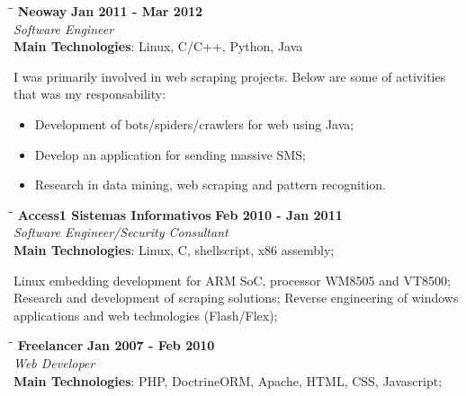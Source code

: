 \documentclass[margin]{res}
\begin{document}
\begin{resume}
   \begin{tabbing}
   \hspace{2.3in}\= \hspace{1.7in}\= \kill %
    \textbf{Neoway}    \>\>\textbf{Jan 2011 - Mar 2012}\\
    \textit{Software Engineer}\\   
    \textbf{Main Technologies}: Linux, C/C++, Python, Java
   \end{tabbing}\vspace{-20pt}      %
    \vspace{2mm}
    I was primarily involved in web scraping projects. Below are some of activities that was my responsability:
    
    \begin{itemize}
  \item Development of bots/spiders/crawlers for web using Java;
  \item Develop an application for sending massive SMS;
  \item Research in data mining, web scraping and pattern recognition.
\end{itemize}

   
   \vspace{2mm}
   \begin{tabbing}
   \hspace{2.3in}\= \hspace{1.5in}\= \kill %
    \textbf{Access1 Sistemas Informativos}    \>\>\textbf{Feb 2010 - Jan 2011}\\
    \textit{Software Engineer/Security Consultant}\\   
    \textbf{Main Technologies}: Linux, C, shellscript, x86 assembly;
   \end{tabbing}\vspace{-20pt}      %
    \vspace{2mm}
    
    Linux embedding development for ARM SoC, processor WM8505 and VT8500;
    Research and development of scraping solutions;
    Reverse engineering of windows applications and web technologies (Flash/Flex);
    
       
   \vspace{2mm}
   \begin{tabbing}
   \hspace{2.3in}\= \hspace{1.5in}\= \kill %
    \textbf{Freelancer}    \>\>\textbf{Jan 2007 - Feb 2010}\\
    \textit{Web Developer}\\   
    \textbf{Main Technologies}: PHP, DoctrineORM, Apache, HTML, CSS, Javascript;
   \end{tabbing}\vspace{-20pt}      %
    \vspace{2mm}
    

\end{resume}
\end{document}

